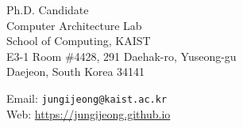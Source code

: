 \begin{minipage}[t]{0.6\textwidth}
  Ph.D. Candidate\\
  Computer Architecture Lab\\
  School of Computing, KAIST\\
  E3-1 Room \#4428, 291 Daehak-ro, Yuseong-gu\\
  Daejeon, South Korea 34141
\end{minipage}
\begin{minipage}[t]{0.4\textwidth}
  Email: \texttt{jungijeong@kaist.ac.kr} \\
  Web: \url{https://jungijeong.github.io} \\
\end{minipage}
